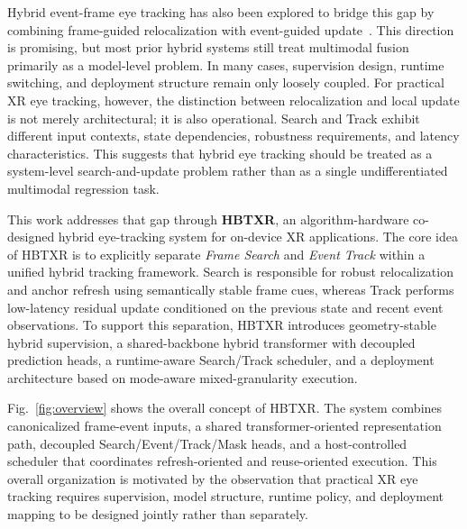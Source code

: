 ﻿\documentclass[journal]{IEEEtran}
\begin{document}
Hybrid event-frame eye tracking has also been explored to bridge this gap by combining frame-guided relocalization with event-guided update~\cite{chen2025ex}. This direction is promising, but most prior hybrid systems still treat multimodal fusion primarily as a model-level problem. In many cases, supervision design, runtime switching, and deployment structure remain only loosely coupled. For practical XR eye tracking, however, the distinction between relocalization and local update is not merely architectural; it is also operational. Search and Track exhibit different input contexts, state dependencies, robustness requirements, and latency characteristics. This suggests that hybrid eye tracking should be treated as a system-level search-and-update problem rather than as a single undifferentiated multimodal regression task.

This work addresses that gap through \textbf{HBTXR}, an algorithm-hardware co-designed hybrid eye-tracking system for on-device XR applications. The core idea of HBTXR is to explicitly separate \emph{Frame Search} and \emph{Event Track} within a unified hybrid tracking framework. Search is responsible for robust relocalization and anchor refresh using semantically stable frame cues, whereas Track performs low-latency residual update conditioned on the previous state and recent event observations. To support this separation, HBTXR introduces geometry-stable hybrid supervision, a shared-backbone hybrid transformer with decoupled prediction heads, a runtime-aware Search/Track scheduler, and a deployment architecture based on mode-aware mixed-granularity execution.

Fig.~\ref{fig:overview} shows the overall concept of HBTXR. The system combines canonicalized frame-event inputs, a shared transformer-oriented representation path, decoupled Search/Event/Track/Mask heads, and a host-controlled scheduler that coordinates refresh-oriented and reuse-oriented execution. This overall organization is motivated by the observation that practical XR eye tracking requires supervision, model structure, runtime policy, and deployment mapping to be designed jointly rather than separately.
\end{document}
